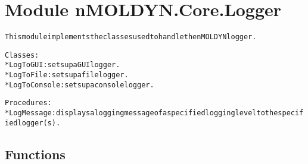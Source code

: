 %
%
%


\section{Module nMOLDYN.Core.Logger}

    \label{nMOLDYN:Core:Logger}
\begin{alltt}
This module implements the classes used to handle the nMOLDYN logger.

Classes:
    * LogToGUI     : sets up a GUI logger.
    * LogToFile    : sets up a file logger.
    * LogToConsole : sets up a console logger.
    
Procedures:
    * LogMessage   : displays a logging message of a specified logging level to the specified logger(s).
\end{alltt}



  \subsection{Functions}

    \label{nMOLDYN:Core:Logger:LogMessage}

    \vspace{0.5ex}

